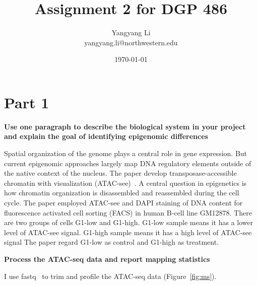 \documentclass{article}
\title{Assignment 2 for DGP 486}
\author{Yangyang Li\\
 yangyang.li@northwestern.edu}
\date{\today}
\begin{document}
\maketitle

\section{Part 1}

\textbf{Use one paragraph to describe the biological system in your project and explain the goal of identifying epigenomic differences}

Spatial organization of the genome plays a central role in gene expression.
But current epigenomic approaches largely map DNA regulatory elements outside of the native context of the nucleus.
The paper develop transposase-accessible chromatin with visualization (ATAC-see)~\citep{Chen2016}.
A central question in epigenetics is how chromatin organization is disassembled and reassembled during the cell cycle.
The paper employed ATAC-see and DAPI staining of DNA content for fluorescence activated cell sorting (FACS) in human B-cell line GM12878.
There are two groups of cells G1-low and G1-high.
G1-low sample means it has a lower level of ATAC-see signal.
G1-high sample means it has a high level of ATAC-see signal
The paper regard G1-low as control and G1-high as treatment.


\textbf{Process the ATAC-seq data and report mapping statistics}

I use fastq~\citep{Chen2018} to trim and profile the ATAC-seq data (Figure~\ref{fig:ms}).
\end{document}
